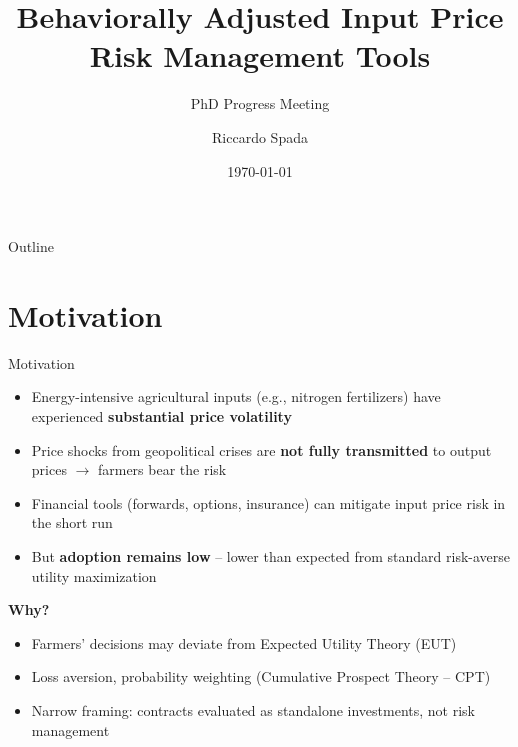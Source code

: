\documentclass[aspectratio=169,12pt]{beamer}
\title[Input Price Risk Management]{Behaviorally Adjusted Input Price Risk Management Tools}
\subtitle{PhD Progress Meeting}
\author{Riccardo Spada}
\institute{Business Economics Group \\ Wageningen University \& Research}
\date{\today}
\begin{document}
\begin{frame}
\titlepage
\end{frame}

\begin{frame}{Outline}
\tableofcontents
\end{frame}

\section{Motivation}

\begin{frame}{Motivation}
\begin{itemize}
    \item Energy-intensive agricultural inputs (e.g., nitrogen fertilizers) have experienced \textbf{substantial price volatility}
    \item Price shocks from geopolitical crises are \textbf{not fully transmitted} to output prices $\rightarrow$ farmers bear the risk
    \item Financial tools (forwards, options, insurance) can mitigate input price risk in the short run
    \item But \textbf{adoption remains low} -- lower than expected from standard risk-averse utility maximization
\end{itemize}

\vspace{0.5em}
\textbf{Why?}
\begin{itemize}
    \item Farmers' decisions may deviate from Expected Utility Theory (EUT)
    \item Loss aversion, probability weighting (Cumulative Prospect Theory -- CPT)
    \item Narrow framing: contracts evaluated as standalone investments, not risk management
\end{itemize}
\end{frame}

\end{document}
